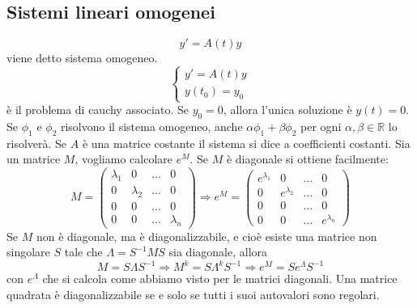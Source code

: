 \subsection{Sistemi lineari omogenei}
\[
    y' = A(t) y
\]
viene detto sistema omogeneo.\newline
\[
    \begin{cases}
        y' = A(t) y\\
        y(t_0) = y_0
    \end{cases}
\]
è il problema di cauchy associato.\newline
\newline
Se $y_0 = 0$, allora l'unica soluzione è $y(t) = 0$.\newline
\newline
Se $\phi_1$ e $\phi_2$ risolvono il sistema omogeneo, anche $\alpha \phi_1 + \beta \phi_2$ per ogni $\alpha, \beta \in \mathbb{R}$ lo risolverà.\newline
\newline
Se $A$ è una matrice costante il sistema si dice a coefficienti costanti.\newline
\newline
Sia un matrice $M$, vogliamo calcolare $e^{M}$. \newline
Se $M$ è diagonale si ottiene facilmente:
\[
    M = \left( \begin{matrix}
        \lambda_1  & 0 &\dots & 0\\
        0 & \lambda_2 &\dots &0\\
        0 & 0 &\dots &0\\
        0 & 0 &\dots &\lambda_n
    \end{matrix} \right) \Rightarrow e^M = \left( \begin{matrix}
        e^{\lambda_1}  & 0 &\dots & 0\\
        0 & e^{\lambda_2} &\dots &0\\
        0 & 0 &\dots &0\\
        0 & 0 &\dots & e^{\lambda_n}
    \end{matrix} \right)
\]
Se $M$ non è diagonale, ma è diagonalizzabile, e cioè esiste una matrice non singolare $S$ tale che $\Lambda = S^{-1}MS$ sia diagonale, allora
\[
    M = S\Lambda S^{-1} \Rightarrow  M^k = S\Lambda^kS^{-1} \Rightarrow e^M = S e^{\Lambda}S^{-1}
\]
con $e^{\Lambda}$ che si calcola come abbiamo visto per le matrici diagonali.\newline
\newline
Una matrice quadrata è diagonalizzabile se e solo se tutti i suoi autovalori sono regolari. \newline
